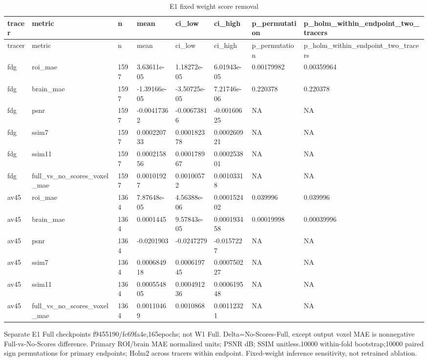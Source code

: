 \begin{landscape}
\begingroup
\footnotesize
\setlength{\tabcolsep}{4pt}
\begin{longtable}{llllllll}
\caption{E1 fixed weight score removal}\label{tab:s-n17}\\
\toprule
tracer & metric & n & mean & ci\_low & ci\_high & p\_permutation & p\_holm\_within\_endpoint\_two\_tracers \\
\midrule
\endfirsthead
\toprule
tracer & metric & n & mean & ci\_low & ci\_high & p\_permutation & p\_holm\_within\_endpoint\_two\_tracers \\
\midrule
\endhead
\bottomrule
\endfoot
fdg & roi\_mae & 1597 & 3.63611e-05 & 1.18272e-05 & 6.01943e-05 & 0.00179982 & 0.00359964 \\
fdg & brain\_mae & 1597 & -1.39166e-05 & -3.50725e-05 & 7.21746e-06 & 0.220378 & 0.220378 \\
fdg & psnr & 1597 & -0.00417362 & -0.00673816 & -0.00160625 & NA & NA \\
fdg & ssim7 & 1597 & 0.000220733 & 0.000182378 & 0.000260921 & NA & NA \\
fdg & ssim11 & 1597 & 0.000215856 & 0.000178967 & 0.000253801 & NA & NA \\
fdg & full\_vs\_no\_scores\_voxel\_mae & 1597 & 0.00101927 & 0.00100572 & 0.00103318 & NA & NA \\
av45 & roi\_mae & 1364 & 7.87648e-05 & 4.56388e-06 & 0.000152402 & 0.039996 & 0.039996 \\
av45 & brain\_mae & 1364 & 0.0001445 & 9.57843e-05 & 0.000193458 & 0.00019998 & 0.00039996 \\
av45 & psnr & 1364 & -0.0201903 & -0.0247279 & -0.0157227 & NA & NA \\
av45 & ssim7 & 1364 & 0.000684918 & 0.000619745 & 0.000750227 & NA & NA \\
av45 & ssim11 & 1364 & 0.000554805 & 0.000491236 & 0.000619548 & NA & NA \\
av45 & full\_vs\_no\_scores\_voxel\_mae & 1364 & 0.00110469 & 0.0010868 & 0.00112321 & NA & NA \\
\end{longtable}
\noindent\parbox{\linewidth}{\footnotesize Separate E1 Full checkpoints f9455190/fc69fa4e,165epochs; not W1 Full. Delta=No-Scores-Full, except output voxel MAE is nonnegative Full-vs-No-Scores difference. Primary ROI/brain MAE normalized units; PSNR dB; SSIM unitless.10000 within-fold bootstrap;10000 paired sign permutations for primary endpoints; Holm2 across tracers within endpoint. Fixed-weight inference sensitivity, not retrained ablation.}
\endgroup
\end{landscape}
